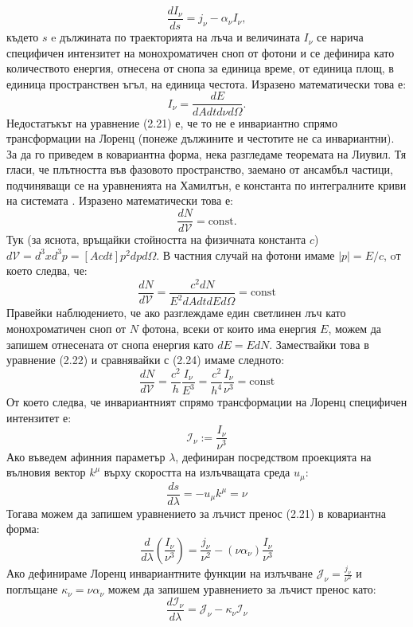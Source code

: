 \begin{equation}
	\frac{dI_\nu}{ds} = j_\nu - \alpha_\nu I_\nu,
\end{equation}
където $s$ e дължината по траекторията на лъча и величината $I_\nu$ се нарича специфичен интензитет на монохроматичен сноп от фотони и се дефинира като количеството енергия, отнесена от снопа за единица време, от единица площ, в единица пространствен ъгъл, на единица честота. Изразено математически това е:
\begin{equation}
	I_\nu = \frac{dE}{dAdtd\nu d\Omega}.
\end{equation}
Недостатъкът на уравнение (2.21) е, че то не е инвариантно спрямо трансформации на Лоренц (понеже дължините и честотите не са инвариантни). За да го приведем в ковариантна форма, нека разгледаме теоремата на Лиувил. Тя гласи, че плътността във фазовото пространство, заемано от ансамбъл частици, подчиняващи се на уравненията на Хамилтън, е константа по интегралните криви на системата \cite{Misner1973}. Изразено математически това е:
\begin{equation}
	\frac{dN}{d\mathcal{V}} = \text{const}.
\end{equation}
Тук (за яснота, връщайки стойността на физичната константа $c$) $d\mathcal{V} = d^3x d^3p = \left[A cdt\right] p^2dpd\Omega$. В частния случай на фотони имаме $|p| = E / c$, oт което следва, че:
\begin{equation}
	\frac{dN}{d\mathcal{V}} = \frac{c^2dN}{E^2dAdtdEd\Omega} = \text{const}
\end{equation}
Правейки наблюдението, че ако разглеждаме един светлинен лъч като монохроматичен сноп от $N$ фотона, всеки от които има енергия $E$, можем да запишем отнесената от снопа енергия като $dE = EdN$. Замествайки това в уравнение (2.22) и сравнявайки с (2.24) имаме следното:
\begin{equation}
	\frac{dN}{d\mathcal{V}} = \frac{c^2}{h}\frac{I_\nu}{E^3} = \frac{c^2}{h^4}\frac{I_\nu}{\nu^3} = \text{const}
\end{equation}
От което следва, че инвариантният спрямо трансформации на Лоренц специфичен интензитет е:
\begin{equation}
	\mathcal{I}_\nu := \frac{I_\nu}{\nu^3}
\end{equation}
Ако въведем афинния параметър $\lambda$, дефиниран посредством проекцията на вълновия вектор $k^\mu$ върху скоростта на излъчващата среда $u_\mu$:
\begin{equation}
	\frac{ds}{d\lambda} = -u_\mu k^\mu = \nu
\end{equation}
Тогава можем да запишем уравнението за лъчист пренос (2.21) в ковариантна форма:
\begin{equation}
	\frac{d}{d\lambda}\left(\frac{I_\nu}{\nu^3}\right) = \frac{j_\nu}{\nu^2} - (\nu\alpha_\nu)\frac{I_\nu}{\nu^3}
\end{equation}
Ако дефинираме Лоренц инвариантните функции на излъчване $\mathcal{J}_\nu = \frac{j_\nu}{\nu^2}$ и поглъщане $\kappa_\nu = \nu\alpha_\nu$ можем да запишем уравнението за лъчист пренос като:
\begin{equation}
	\frac{d\mathcal{I}_\nu}{d\lambda} = \mathcal{J}_\nu - \kappa_\nu\mathcal{I}_\nu
\end{equation}
